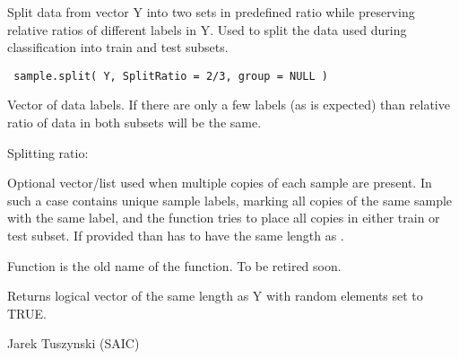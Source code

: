 \begin{Description}\relax
Split data from vector Y into two sets in predefined ratio while 
preserving relative ratios of different labels in Y. Used to split the data
used during classification into train and test subsets.
\end{Description}
\begin{Usage}
\begin{verbatim}
 sample.split( Y, SplitRatio = 2/3, group = NULL )
\end{verbatim}
\end{Usage}
\begin{Arguments}
\begin{ldescription}
\item[\code{Y}] Vector of data labels. If there are only a few labels (as is 
expected) than relative ratio of data in both subsets will be the same.
\item[\code{SplitRatio}] Splitting ratio: 

\item[\code{group}] Optional vector/list used when multiple copies of each sample 
are present. In such a case  contains unique sample labels, 
marking all copies of the same sample with the same 
label, and the function tries to place all copies in either train or test 
subset. If provided than has to have the same length as .
\end{ldescription}
\end{Arguments}
\begin{Details}\relax
Function  is the old name of the 
 function. To be retired soon.
\end{Details}
\begin{Value}
Returns logical vector of the same length as Y with random
 elements set to TRUE.
\end{Value}
\begin{Author}\relax
Jarek Tuszynski (SAIC) 
\end{Author}
